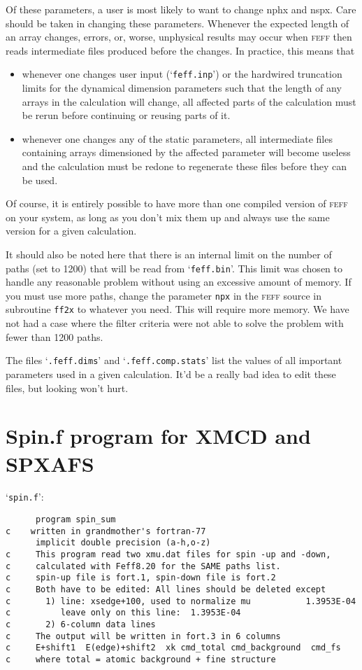 \documentclass[11pt,oneside]{report} %
\newcommand{\program}[1]{\textsc{#1}}
\newcommand{\feff}{\program{feff}}
\newcommand{\file}[1]{`\texttt{#1}'}
\begin{document}
\begin{latexonly}
Of these parameters, a user is most likely to want to change nphx and nspx.
Care should be taken in changing these parameters.  Whenever the expected length of an array changes,
errors, or, worse, unphysical results may occur when {\feff} then reads intermediate files produced
before the changes.  In practice, this means that
\begin{itemize}
\item whenever one changes user input (\file{feff.inp}) or the hardwired truncation limits for the dynamical
dimension parameters such that the length of any arrays in the calculation will change, all affected parts
of the calculation must be rerun before continuing or reusing parts of it.
\item whenever one changes any of the static parameters, all intermediate files containing arrays dimensioned by
the affected parameter will become useless and the calculation must be redone to regenerate these files before they can be used.
\end{itemize}

Of course, it is entirely possible to have more than one compiled version of {\feff} on your system, as long as you
don't mix them up and always use the same version for a given calculation.

It should also be noted here that there is an internal limit on the 
number of paths (set to 1200) that will be read from \file{feff.bin}. 
This limit was chosen to handle any reasonable problem without using 
an excessive amount of memory. If you must use more paths, change the 
parameter \texttt{npx} in the {\feff} source in subroutine \texttt{ff2x} 
to whatever you need. This will require more memory. We have not had 
a case where the filter criteria were not able to solve the problem 
with fewer than 1200 paths.

The files \file{.feff.dims} and \file{.feff.comp.stats} list the values of all important parameters used in a given
calculation.    It'd be a really bad idea to edit these files, but looking won't hurt.



\chapter{Spin.f program for XMCD and SPXAFS}
\label{sec:Append-F-Spinf}
\file{spin.f}:
\begin{verbatim}
      program spin_sum
c    written in grandmother's fortran-77   
      implicit double precision (a-h,o-z)
c     This program read two xmu.dat files for spin -up and -down,
c     calculated with Feff8.20 for the SAME paths list.
c     spin-up file is fort.1, spin-down file is fort.2
c     Both have to be edited: All lines should be deleted except
c       1) line: xsedge+100, used to normalize mu           1.3953E-04
c          leave only on this line:  1.3953E-04
c       2) 6-column data lines
c     The output will be written in fort.3 in 6 columns
c     E+shift1  E(edge)+shift2  xk cmd_total cmd_background  cmd_fs
c     where total = atomic background + fine structure


\end{verbatim}
\end{latexonly}
\end{document}
